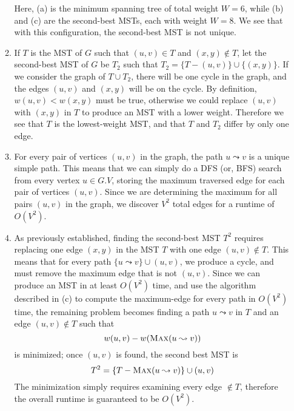 \documentclass{article}
\begin{document}
\begin{enumerate}
\begin{enumerate}
\begin{figure}[H]
        \end{figure}
        Here, (a) is the minimum spanning tree of total weight $W=6$, while (b) and (c) are the second-best MSTs, each with weight $W=8$. We see that with this configuration, the second-best MST is not unique.

        \item If $T$ is the MST of $G$ such that $(u,v) \in T$ and $(x,y) \notin T$, let the second-best MST of $G$ be $T_{2}$ such that $T_{2} = \{T - (u,v)\} \cup \{(x,y)\}$. If we consider the graph of $T \cup T_{2}$, there will be one cycle in the graph, and the edges $(u,v)$ and $(x,y)$ will be on the cycle. By definition, $w(u,v) < w(x,y)$ must be true, otherwise we could replace $(u,v)$ with $(x,y)$ in $T$ to produce an MST with a lower weight. Therefore we see that $T$ is the lowest-weight MST, and that $T$ and $T_{2}$ differ by only one edge.
        \item For every pair of vertices $(u,v)$ in the graph, the path $u \leadsto v$ is a unique simple path. This means that we can simply do a DFS (or, BFS) search from every vertex $u \in G.V$, storing the maximum traversed edge for each pair of vertices $(u,v)$. Since we are determining the maximum for all pairs $(u,v)$ in the graph, we discover $V^{2}$ total edges for a runtime of $O(V^2)$.
        \item As previously established, finding the second-best MST $T^{2}$ requires replacing one edge $(x,y)$ in the MST $T$ with one edge $(u,v) \notin T$. This means that for every path $\{u \leadsto v\} \cup (u,v)$, we produce a cycle, and must remove the maximum edge that is not $(u,v)$. Since we can produce an MST in at least $O(V^{2})$ time, and use the algorithm described in (c) to compute the maximum-edge for every path in $O(V^{2})$ time, the remaining problem becomes finding a path $u \leadsto v$ in $T$ and an edge $(u,v) \notin T$ such that
        $$w(u,v) - w(\textsc{Max}(u \leadsto v))$$
        is minimized; once $(u,v)$ is found, the second best MST is
        $$T^{2} = \{T - \textsc{Max}(u \leadsto v)\} \cup (u,v)$$
        The minimization simply requires examining every edge $\notin T$, therefore the overall runtime is guaranteed to be $O(V^2)$.
    \end{enumerate}
    

\end{enumerate}
\end{document}

